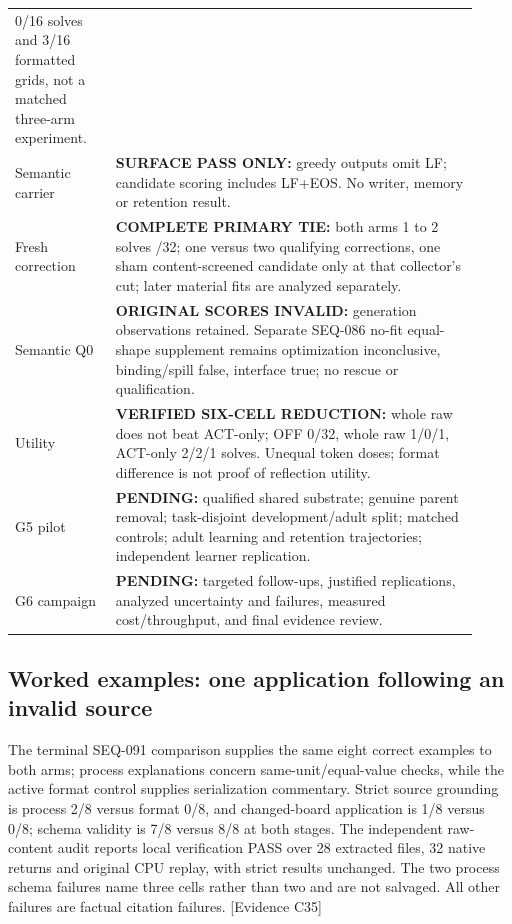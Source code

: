 \documentclass[11pt]{article}
\newcommand{\ev}[1]{\textsf{[Evidence #1]}}
\newcommand{\pending}[1]{\textbf{PENDING:} #1}
\begin{document}
\begin{longtable}{p{0.20\linewidth}p{0.72\linewidth}}
0/16 solves and 3/16 formatted grids, not a matched three-arm experiment. \\
Semantic carrier & \textbf{SURFACE PASS ONLY:} greedy outputs omit LF; candidate
scoring includes LF+EOS. No writer, memory or retention result. \\
Fresh correction & \textbf{COMPLETE PRIMARY TIE:} both arms 1 to 2 solves /32;
one versus two qualifying corrections, one sham content-screened candidate
only at that collector's cut; later material fits are analyzed separately. \\
Semantic Q0 & \textbf{ORIGINAL SCORES INVALID:} generation observations retained.
Separate SEQ-086 no-fit equal-shape supplement remains optimization inconclusive,
binding/spill false, interface true; no rescue or qualification. \\
Utility & \textbf{VERIFIED SIX-CELL REDUCTION:} whole raw does not beat ACT-only;
OFF 0/32, whole raw 1/0/1, ACT-only 2/2/1 solves. Unequal token doses;
format difference is not proof of reflection utility. \\
G5 pilot & \pending{qualified shared substrate; genuine parent removal;
task-disjoint development/adult split; matched controls; adult learning and
retention trajectories; independent learner replication.} \\
G6 campaign & \pending{targeted follow-ups, justified replications, analyzed
uncertainty and failures, measured cost/throughput, and final evidence review.} \\
\bottomrule
\end{longtable}

\subsection{Worked examples: one application following an invalid source}
The terminal SEQ-091 comparison supplies the same eight correct examples to
both arms; process explanations concern same-unit/equal-value checks, while
the active format control supplies serialization commentary. Strict source
grounding is process 2/8 versus format 0/8, and changed-board application is
1/8 versus 0/8; schema validity is 7/8 versus 8/8 at both stages. The independent
raw-content audit reports local verification PASS over 28 extracted files,
32 native returns and original CPU replay, with strict results unchanged.
The two process schema failures name three cells rather than two and are not
salvaged. All other failures are factual citation failures. \ev{C35}
\end{document}
